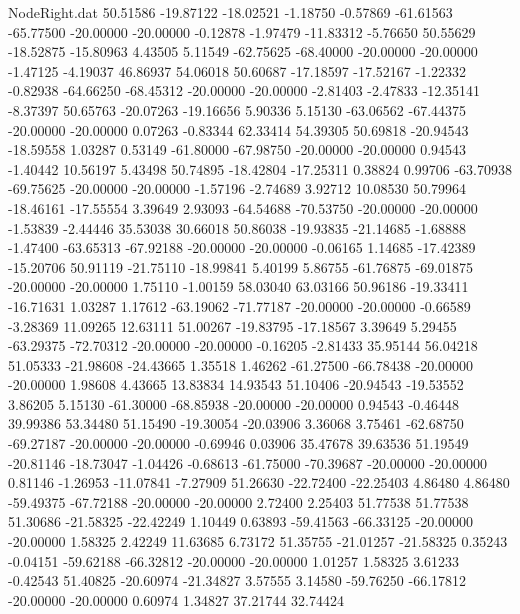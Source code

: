 \begin{filecontents}{NodeRight.dat}
  50.51586  -19.87122  -18.02521    -1.18750   -0.57869  -61.61563  -65.77500  -20.00000  -20.00000   -0.12878   -1.97479  -11.83312   -5.76650
  50.55629  -18.52875  -15.80963     4.43505    5.11549  -62.75625  -68.40000  -20.00000  -20.00000   -1.47125   -4.19037   46.86937   54.06018
  50.60687  -17.18597  -17.52167    -1.22332   -0.82938  -64.66250  -68.45312  -20.00000  -20.00000   -2.81403   -2.47833  -12.35141   -8.37397
  50.65763  -20.07263  -19.16656     5.90336    5.15130  -63.06562  -67.44375  -20.00000  -20.00000    0.07263   -0.83344   62.33414   54.39305
  50.69818  -20.94543  -18.59558     1.03287    0.53149  -61.80000  -67.98750  -20.00000  -20.00000    0.94543   -1.40442   10.56197    5.43498
  50.74895  -18.42804  -17.25311     0.38824    0.99706  -63.70938  -69.75625  -20.00000  -20.00000   -1.57196   -2.74689    3.92712   10.08530
  50.79964  -18.46161  -17.55554     3.39649    2.93093  -64.54688  -70.53750  -20.00000  -20.00000   -1.53839   -2.44446   35.53038   30.66018
  50.86038  -19.93835  -21.14685    -1.68888   -1.47400  -63.65313  -67.92188  -20.00000  -20.00000   -0.06165    1.14685  -17.42389  -15.20706
  50.91119  -21.75110  -18.99841     5.40199    5.86755  -61.76875  -69.01875  -20.00000  -20.00000    1.75110   -1.00159   58.03040   63.03166
  50.96186  -19.33411  -16.71631     1.03287    1.17612  -63.19062  -71.77187  -20.00000  -20.00000   -0.66589   -3.28369   11.09265   12.63111
  51.00267  -19.83795  -17.18567     3.39649    5.29455  -63.29375  -72.70312  -20.00000  -20.00000   -0.16205   -2.81433   35.95144   56.04218
  51.05333  -21.98608  -24.43665     1.35518    1.46262  -61.27500  -66.78438  -20.00000  -20.00000    1.98608    4.43665   13.83834   14.93543
  51.10406  -20.94543  -19.53552     3.86205    5.15130  -61.30000  -68.85938  -20.00000  -20.00000    0.94543   -0.46448   39.99386   53.34480
  51.15490  -19.30054  -20.03906     3.36068    3.75461  -62.68750  -69.27187  -20.00000  -20.00000   -0.69946    0.03906   35.47678   39.63536
  51.19549  -20.81146  -18.73047    -1.04426   -0.68613  -61.75000  -70.39687  -20.00000  -20.00000    0.81146   -1.26953  -11.07841   -7.27909
  51.26630  -22.72400  -22.25403     4.86480    4.86480  -59.49375  -67.72188  -20.00000  -20.00000    2.72400    2.25403   51.77538   51.77538
  51.30686  -21.58325  -22.42249     1.10449    0.63893  -59.41563  -66.33125  -20.00000  -20.00000    1.58325    2.42249   11.63685    6.73172
  51.35755  -21.01257  -21.58325     0.35243   -0.04151  -59.62188  -66.32812  -20.00000  -20.00000    1.01257    1.58325    3.61233   -0.42543
  51.40825  -20.60974  -21.34827     3.57555    3.14580  -59.76250  -66.17812  -20.00000  -20.00000    0.60974    1.34827   37.21744   32.74424

\end{filecontents}
